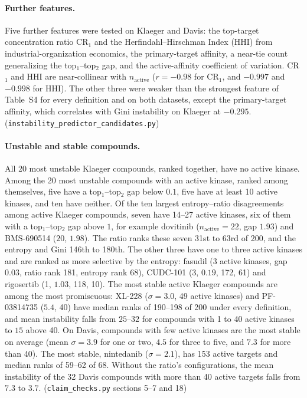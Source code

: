 \documentclass[11pt]{article}
\begin{document}
\paragraph{Further features.} Five further features were tested on Klaeger and
Davis: the top-target concentration ratio CR$_1$ and the
Herfindahl--Hirschman Index (HHI) from industrial-organization economics, the
primary-target affinity, a near-tie count generalizing the top$_1$--top$_2$ gap,
and the active-affinity coefficient of variation. CR$_1$ and HHI are
near-collinear with $n_\mathrm{active}$ ($r = -0.98$ for CR$_1$, and $-0.997$
and $-0.998$ for HHI). The other three were weaker than the strongest feature
of Table~S4 for every definition and on both datasets, except the primary-target
affinity, which correlates with Gini instability on Klaeger at $-0.295$.
(\texttt{instability\_\allowbreak{}predictor\_\allowbreak{}candidates.py})

\paragraph{Unstable and stable compounds.} All 20 most unstable Klaeger
compounds, ranked together, have no active kinase. Among the 20 most unstable
compounds with an active kinase, ranked among themselves, five have a
top$_1$--top$_2$ gap below $0.1$, five have at least 10 active kinases, and ten
have neither. Of the ten largest entropy--ratio disagreements among active
Klaeger compounds, seven have 14--27 active kinases, six of them with a
top$_1$--top$_2$ gap above $1$, for example dovitinib ($n_\mathrm{active} = 22$,
gap $1.93$) and BMS-690514 ($20$, $1.98$). The ratio ranks these seven 31st to
63rd of 200, and the entropy and Gini 146th to 180th. The other three have one
to three active kinases and are ranked as more selective by the entropy:
fasudil (3 active kinases, gap $0.03$, ratio rank 181, entropy rank 68),
CUDC-101 (3, $0.19$, 172, 61) and rigosertib (1, $1.03$, 118, 10). The most stable active Klaeger compounds
are among the most promiscuous: XL-228 ($\sigma = 3.0$, 49 active kinases) and
PF-03814735 ($5.4$, 40) have median ranks of 190--198 of 200 under every
definition, and mean instability falls from $25$--$32$ for compounds with 1 to
40 active kinases to $15$ above 40. On Davis, compounds with few active kinases
are the most stable on average (mean $\sigma = 3.9$ for one or two, $4.5$ for
three to five, and $7.3$ for more than 40). The most stable, nintedanib
($\sigma = 2.1$), has 153 active targets and median ranks of 59--62 of 68.
Without the ratio's configurations, the mean instability of the 32 Davis
compounds with more than 40 active targets falls from $7.3$ to $3.7$.
(\texttt{claim\_checks.py} sections 5--7 and 18)
\end{document}
